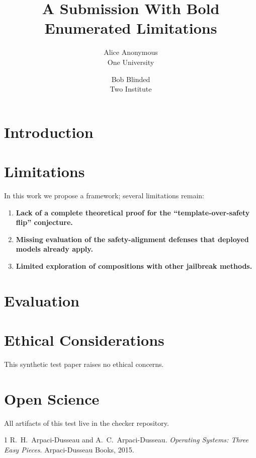 \documentclass[letterpaper,twocolumn,10pt]{article}
\date{}
\title{\Large \bf A Submission With Bold Enumerated Limitations}
\author{{\rm Alice Anonymous}\\One University \and {\rm Bob Blinded}\\Two Institute}
\begin{document}
\maketitle

\begin{abstract}
\lipsum[1][1-5]
\end{abstract}

\section{Introduction}
\lipsum[2-4]

\section{Limitations}
In this work we propose a framework; several limitations remain:

\begin{enumerate}[font=\bfseries,itemsep=0pt,parsep=0pt]
  \item \textbf{Lack of a complete theoretical proof for the
  ``template-over-safety flip'' conjecture.} \lipsum[5][1-3]
  \item \textbf{Missing evaluation of the safety-alignment defenses that
  deployed models already apply.} \lipsum[6][1-3]
  \item \textbf{Limited exploration of compositions with other jailbreak
  methods.} \lipsum[7][1-3]
\end{enumerate}

\section{Evaluation}
\lipsum[8]

\appendix
\section*{Ethical Considerations}
This synthetic test paper raises no ethical concerns.

\section*{Open Science}
All artifacts of this test live in the checker repository.

\begin{thebibliography}{1}
 R.~H.\ Arpaci-Dusseau and A.~C.\ Arpaci-Dusseau.
  \emph{Operating Systems: Three Easy Pieces}. Arpaci-Dusseau Books, 2015.
\end{thebibliography}
\end{document}
